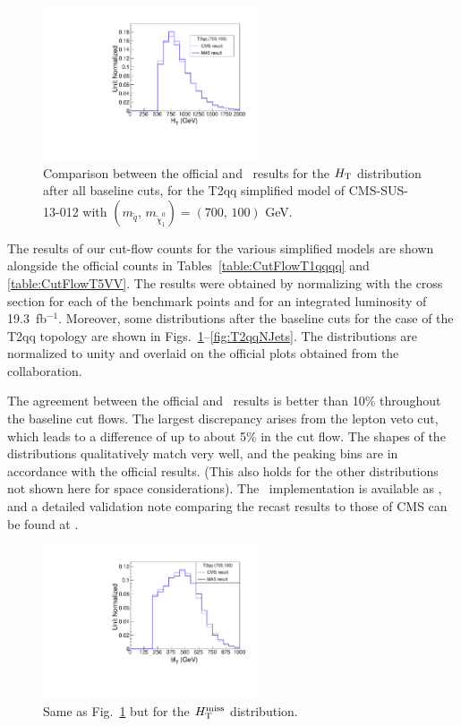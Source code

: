 \begin{figure}[!b]
\centering
\includegraphics[width=6.4cm]{figures/madanalysis5/cms-012-T2qqHT.pdf}
\caption{Comparison between the official and \ma\ results  for the $H_{\rm T}$ distribution after all baseline cuts, 
for the T2qq simplified model of CMS-SUS-13-012 with $(m_{\tilde
  q},\,m_{\tilde\chi^0_1})=(700,\,100)$ GeV.}
\label{fig:T2qqHT}
\end{figure}

The results of our cut-flow counts for the various simplified models are shown alongside the official counts in 
Tables~\ref{table:CutFlowT1qqqq}  and \ref{table:CutFlowT5VV}. The results 
were obtained by normalizing with the cross section for each 
of the benchmark points and for an integrated luminosity of 19.3~fb$^{-1}$.
Moreover, some distributions after the baseline cuts for the case of the T2qq topology 
are shown in Figs.~\ref{fig:T2qqHT}--\ref{fig:T2qqNJets}. 
The distributions are normalized to unity and overlaid on the official plots obtained from the collaboration.



The agreement between the official and \ma\ results is better than 10\% throughout the baseline cut flows. The largest discrepancy arises from the lepton veto cut, which leads to a difference of up to about 5\% in the cut flow. The shapes of the distributions qualitatively match very well, and the peaking bins are in accordance with the official results. (This also holds for the other distributions not shown here for space considerations). 
The \ma\ implementation is available as \cite{MA5-CMS-SUS-13-012}, and 
a detailed validation note comparing the recast results to those of CMS can be found at \cite{ma5wiki}. 


\begin{figure}
\centering
\includegraphics[width=6.4cm]{figures/madanalysis5/cms-012-T2qqMHT.pdf}
\caption{Same as Fig.~\ref{fig:T2qqHT} but for the $H_{\text{T}}^{\rm miss}$ distribution.}
\label{fig:T2qqMHT}
\end{figure}


